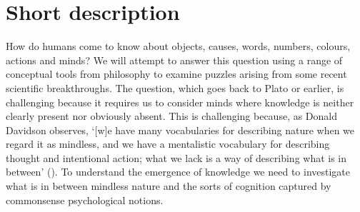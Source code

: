 \documentclass[12pt,\papersize]{extarticle}
\begin{document}
\setlength\footnotesep{1em}




\maketitle
%
%




\section{Short description}
How do humans come to know about objects, causes, words, numbers, colours, actions and minds?  We will attempt to answer this question using a range of conceptual tools from philosophy to examine puzzles arising from some recent scientific breakthroughs.  The question, which goes back to Plato or earlier, is challenging because it requires us to consider minds where knowledge is neither clearly present nor obviously absent. This is challenging because, as Donald Davidson observes, ‘[w]e have many vocabularies for describing nature when we regard it as mindless, and we have a mentalistic vocabulary for describing thought and intentional action; what we lack is a way of describing what is in between’ (\citeyear[p.\ 11]{Davidson:1999ju}).  To understand the emergence of knowledge we need to investigate what is in between mindless nature and the sorts of cognition captured by commonsense psychological notions.  




%
	
\end{document}

